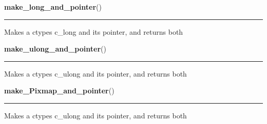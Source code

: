     \label{xformslib:library:make_long_and_pointer}

    \vspace{0.5ex}

\hspace{.8\funcindent}\begin{boxedminipage}{\funcwidth}

    \raggedright \textbf{make\_long\_and\_pointer}()

    \vspace{-1.5ex}

    \rule{\textwidth}{0.5\fboxrule}
\setlength{\parskip}{2ex}
    Makes a ctypes c\_long and its pointer, and returns both

\setlength{\parskip}{1ex}
    \end{boxedminipage}

    \label{xformslib:library:make_ulong_and_pointer}

    \vspace{0.5ex}

\hspace{.8\funcindent}\begin{boxedminipage}{\funcwidth}

    \raggedright \textbf{make\_ulong\_and\_pointer}()

    \vspace{-1.5ex}

    \rule{\textwidth}{0.5\fboxrule}
\setlength{\parskip}{2ex}
    Makes a ctypes c\_ulong and its pointer, and returns both

\setlength{\parskip}{1ex}
    \end{boxedminipage}

    \label{xformslib:library:make_ulong_and_pointer}

    \vspace{0.5ex}

\hspace{.8\funcindent}\begin{boxedminipage}{\funcwidth}

    \raggedright \textbf{make\_Pixmap\_and\_pointer}()

    \vspace{-1.5ex}

    \rule{\textwidth}{0.5\fboxrule}
\setlength{\parskip}{2ex}
    Makes a ctypes c\_ulong and its pointer, and returns both

\setlength{\parskip}{1ex}
    \end{boxedminipage}

